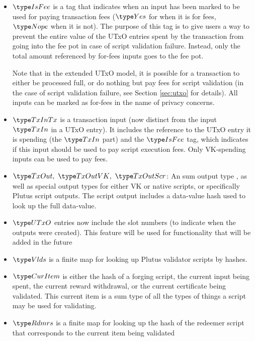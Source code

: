 \begin{itemize}
  \item $\IsFee$ is a tag that indicates when an input has been marked
  to be used for paying transaction fees ($\Yes$ for when it is for fees,
  $\Nope$ when it is not). The purpose of this tag is to give users a way to prevent
  the entire value of the UTxO entries spent by the transaction
  from going into the fee pot in case of script validation failure.
  Instead, only the total amount referenced by for-fees inputs goes
  to the fee pot.

  Note that in the extended UTxO model, it is possible for a transaction
  to either be processed full, or do nothing but pay fees for script
  validation (in the case of script validation failure, see Section
  \ref{sec:utxo} for details). All inputs can be marked as for-fees in
  the name of privacy concerns.

  \item $\TxInTx$ is a transaction input (now distinct from the input $\TxIn$ in
  a UTxO entry). It includes the reference to the UTxO entry it is spending
  (the $\TxIn$ part) and the $\IsFee$ tag, which indicates if this input should
  be used to pay script execution fees. Only VK-spending inputs can be used to
  pay fees.

  \item $\TxOut,~\TxOutVK,~\TxOutScr$: An sum output type ,
  as well as special output types for either VK or native scripts, or
  specifically Plutus script outputs. The script output
  includes a data-value hash used to look up the full data-value.

  \item $\UTxO$ entries now include the slot numbers (to indicate when the
  outputs were created).
  This feature will be used for functionality that will be added in the future

  \item $\Vlds$ is a finite map for looking up Plutus
  validator scripts by hashes.

  \item $\CurItem$ is either the hash of a
  forging script, the current input being
  spent, the current reward
  withdrawal, or the current certificate being validated.
  This current item is a sum type of all the types of things a script may be used
  for validating.

  \item $\Rdmrs$ is a finite map for looking up the hash of the redeemer script
  that corresponds to the current item being validated
\end{itemize}


